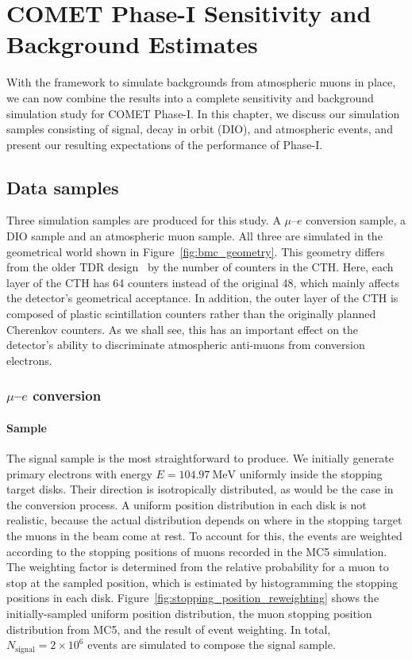 \chapter{COMET Phase-I Sensitivity and Background Estimates}

With the framework to simulate backgrounds from atmospheric muons in place, we
can now combine the results into a complete sensitivity and background
simulation study for COMET Phase-I. In this chapter, we discuss our simulation
samples consisting of signal, decay in orbit (DIO), and atmospheric events, and
present our resulting expectations of the performance of Phase-I.

\section{Data samples}
Three simulation samples are produced for this study. A $\mu$--$e$ conversion
sample, a DIO sample and an atmospheric muon sample. All three are simulated in
the geometrical world shown in Figure~\ref{fig:bmc_geometry}. This geometry
differs from the older TDR design~\cite{the_comet_collaboration_comet_2020} by
the number of counters in the CTH. Here, each layer of the CTH has 64 counters
instead of the original 48, which mainly affects the detector's geometrical
acceptance. In addition, the outer layer of the CTH is composed of plastic
scintillation counters rather than the originally planned Cherenkov counters. As
we shall see, this has an important effect on the detector's ability to
discriminate atmospheric anti-muons from conversion electrons.

\subsection{\texorpdfstring{$\mu$--$e$}{Muon to electron} conversion} 

\subsubsection{Sample}

The signal sample is the most straightforward to produce. We initially generate
primary electrons with energy $E=\SI{104.97}{\MeV}$ uniformly inside the
stopping target disks. Their direction is isotropically distributed, as would be
the case in the conversion process. A uniform position distribution in each disk
is not realistic, because the actual distribution depends on where in the
stopping target the muons in the beam come at rest. To account for this, the
events are weighted according to the stopping positions of muons recorded in the
MC5 simulation. The weighting factor is determined from the relative probability
for a muon to stop at the sampled position, which is estimated by histogramming
the stopping positions in each disk.
Figure~\ref{fig:stopping_position_reweighting} shows the initially-sampled
uniform position distribution, the muon stopping position distribution from MC5,
and the result of event weighting. In total, $N_\mathrm{signal} =
2\times 10^6$ events are simulated to compose the signal sample.

